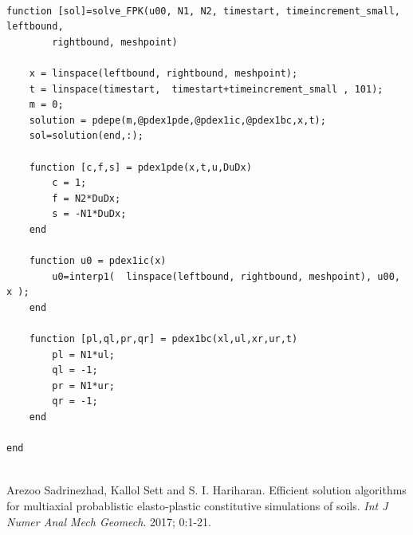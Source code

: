 \documentclass[12pt]{article}
\begin{document}
\begin{lstlisting}

function [sol]=solve_FPK(u00, N1, N2, timestart, timeincrement_small, leftbound,
 		rightbound, meshpoint)

    x = linspace(leftbound, rightbound, meshpoint);
    t = linspace(timestart,  timestart+timeincrement_small , 101);
    m = 0;
    solution = pdepe(m,@pdex1pde,@pdex1ic,@pdex1bc,x,t);
    sol=solution(end,:);

    function [c,f,s] = pdex1pde(x,t,u,DuDx)
        c = 1;
        f = N2*DuDx;
        s = -N1*DuDx;
    end

    function u0 = pdex1ic(x)
        u0=interp1(  linspace(leftbound, rightbound, meshpoint), u00, x );
    end

    function [pl,ql,pr,qr] = pdex1bc(xl,ul,xr,ur,t)
        pl = N1*ul;
        ql = -1;
        pr = N1*ur;
        qr = -1;
    end

end


\end{lstlisting}

\begin{thebibliography}{9}
Arezoo Sadrinezhad, Kallol Sett and S. I. Hariharan. 
Efficient solution algorithms for multiaxial probablistic elasto-plastic constitutive simulations of soils.
\textit{Int J Numer Anal Mech Geomech}. 
2017; 0:1-21.
 

\end{thebibliography}
\end{document}
